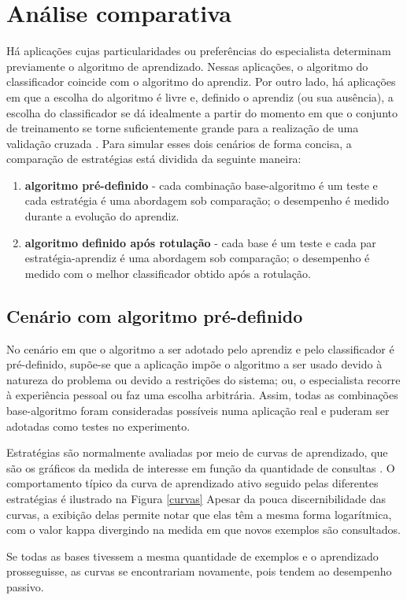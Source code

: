 \section{Análise comparativa}\label{comparativa}
\usetikzlibrary{external}
Há aplicações cujas particularidades ou preferências do especialista determinam
previamente o algoritmo de aprendizado. 
Nessas aplicações, o algoritmo do classificador coincide com o algoritmo do aprendiz.
Por outro lado, há aplicações em que a escolha do algoritmo é livre e, definido o
aprendiz (ou sua ausência), a escolha do classificador se dá idealmente a partir do
momento em que o conjunto de treinamento se torne suficientemente grande para
a realização de uma validação cruzada .
Para simular esses dois cenários de forma concisa,
a comparação de estratégias está dividida da seguinte maneira:
\begin{enumerate}
  \item \textbf{algoritmo pré-definido} -
  cada combinação base-algoritmo é um teste e cada estratégia é uma abordagem sob comparação;
  o desempenho é medido durante a evolução do aprendiz.
  \item \textbf{algoritmo definido após rotulação} -
  cada base é um teste e cada par estratégia-aprendiz é uma abordagem sob comparação;
  o desempenho é medido com o melhor classificador obtido após a rotulação.
\end{enumerate}

\subsection{Cenário com algoritmo pré-definido}\label{predefinido}

No cenário em que o algoritmo a ser adotado pelo aprendiz e pelo classificador é
pré-definido, supõe-se que a aplicação impõe
o algoritmo a ser usado devido à natureza do problema ou devido a restrições do sistema; ou,
o especialista recorre à experiência pessoal ou faz uma escolha arbitrária.
Assim, todas as combinações base-algoritmo foram consideradas possíveis numa aplicação real
e puderam ser adotadas como testes no experimento.

Estratégias são normalmente avaliadas por meio de curvas de aprendizado,
que são os gráficos da medida de interesse em função da quantidade de consultas
\citep{settles2010active}.
O comportamento típico da curva de aprendizado ativo seguido pelas diferentes estratégias
é ilustrado na Figura \ref{curvas}
Apesar da pouca discernibilidade das curvas, a exibição delas permite notar
que elas têm a mesma forma logarítmica, com o valor kappa divergindo na medida em que novos
exemplos são consultados.

Se todas as bases tivessem a mesma quantidade de exemplos
e o aprendizado prosseguisse, as curvas se encontrariam novamente,
pois tendem ao desempenho passivo.

